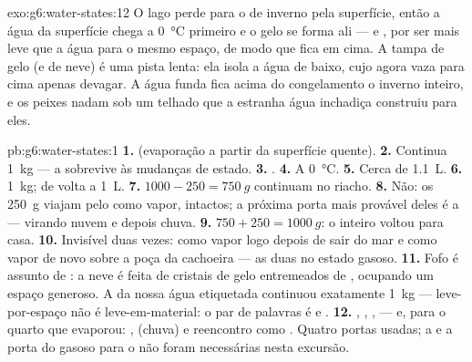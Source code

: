 \begin{solution}{exo:g6:water-states:12}
O lago perde  para o  de inverno pela superfície, então a água
da superfície chega a \qty{0}{\celsius} primeiro e o gelo se forma
ali --- e , por ser mais leve que a água para o mesmo espaço,
de modo que fica em cima. A tampa de gelo (e de neve) é uma pista
lenta: ela isola a água de baixo, cujo  agora vaza para cima
apenas devagar. A água funda fica acima do congelamento o inverno
inteiro, e os peixes nadam sob um telhado que a estranha água
inchadiça construiu para eles.
\end{solution}

\begin{solution}{pb:g6:water-states:1}
\textbf{1.}  (evaporação a partir da superfície quente).
\textbf{2.} Continua \qty{1}{kg} --- a  sobrevive às mudanças de
estado.
\textbf{3.} .
\textbf{4.} A \qty{0}{\celsius}.
\textbf{5.} Cerca de \qty{1.1}{L}.
\textbf{6.}  \qty{1}{kg};  de volta a \qty{1}{L}.
\textbf{7.} $1000 - 250 = \qty{750}{g}$ continuam no riacho.
\textbf{8.} Não: os \qty{250}{g} viajam pelo  como vapor, intactos;
a próxima porta mais provável deles é a  --- virando
nuvem e depois chuva.
\textbf{9.} $750 + 250 = \qty{1000}{g}$: o  inteiro voltou
para casa.
\textbf{10.} Invisível duas vezes: como vapor logo depois de sair do
mar e como vapor de novo sobre a poça da cachoeira --- as duas no
estado gasoso.
\textbf{11.} Fofo é assunto de \emph{}: a neve é feita de
cristais de gelo entremeados de , ocupando um espaço generoso. A
\emph{} da nossa água etiquetada continuou exatamente
\qty{1}{kg} --- leve-por-espaço não é leve-em-material: o par de
palavras é  e .
\textbf{12.} , , ,  --- e,
para o quarto que evaporou: ,  (chuva) e
reencontro como . Quatro portas usadas; a  e a porta
do gasoso para o  não foram necessárias nesta excursão.
\end{solution}
